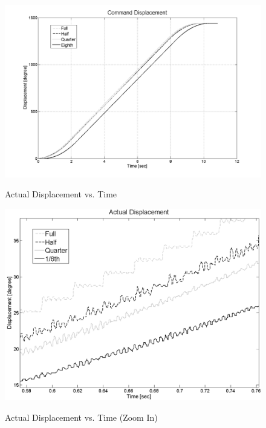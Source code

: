 \documentclass{article}
\theoremstyle{plain}
\theoremstyle{definition}
\theoremstyle{remark}
\begin{document}
\begin{figure}[h]
\begin{center}
\includegraphics[width=12cm]{Q4_ActualPosition.png}
\caption{Actual Displacement vs. Time} \label{tex}
\label{fig:q4_9}
\end{center}
\end{figure}

\begin{figure}[h]
\begin{center}
\includegraphics[width=12cm]{Q4_ActualPosition_L.png}
\caption{Actual Displacement vs. Time (Zoom In)} \label{tex}
\label{fig:q4_10}
\end{center}
\end{figure}
\end{document}
